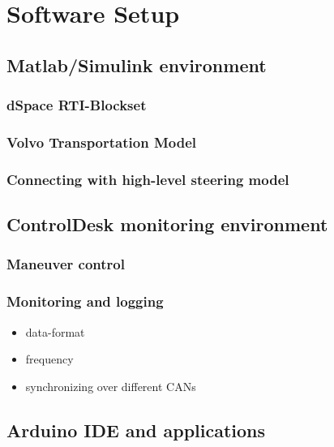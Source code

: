 \documentclass[ExampleMasters.tex]{subfiles}
\begin{document}
\clearpage


\chapter{Software Setup}
\label{chap:software_setup}
\section{Matlab/Simulink environment}
\label{sec:matlab}
\subsection{dSpace RTI-Blockset}
\subsection{Volvo Transportation Model}
\subsection{Connecting with high-level steering model}


\section{ControlDesk monitoring environment}
\label{sec:control_desk}
\subsection{Maneuver control}


\subsection{Monitoring and logging}
\begin{itemize}
	\item data-format
	\item frequency
	\item synchronizing over different CANs	
\end{itemize}


\section{Arduino IDE and applications}
\label{sec:arduino_applications}
\end{document}

